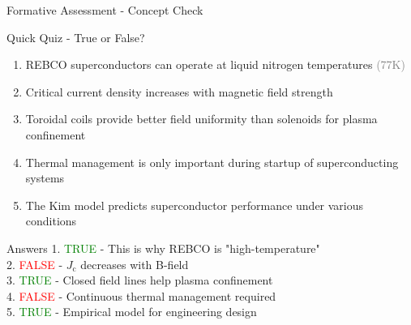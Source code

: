 \documentclass[aspectratio=169,xcolor={table,dvipsnames}]{beamer}
\newcommand{\Jc}{J_\text{c}}
\begin{document}
\begin{frame}{Formative Assessment - Concept Check}
    \begin{block}{Quick Quiz - True or False?}
        \begin{enumerate}
            \item REBCO superconductors can operate at liquid nitrogen temperatures \textcolor{gray}{(77K)}
            \item Critical current density increases with magnetic field strength
            \item Toroidal coils provide better field uniformity than solenoids for plasma confinement
            \item Thermal management is only important during startup of superconducting systems
            \item The Kim model predicts superconductor performance under various conditions
        \end{enumerate}
    \end{block}
    
    \pause
    \begin{alertblock}{Answers}
        1. \textcolor{green}{TRUE} - This is why REBCO is "high-temperature" \\
        2. \textcolor{red}{FALSE} - $\Jc$ decreases with B-field \\
        3. \textcolor{green}{TRUE} - Closed field lines help plasma confinement \\
        4. \textcolor{red}{FALSE} - Continuous thermal management required \\
        5. \textcolor{green}{TRUE} - Empirical model for engineering design
    \end{alertblock}
\end{frame}
\end{document}
